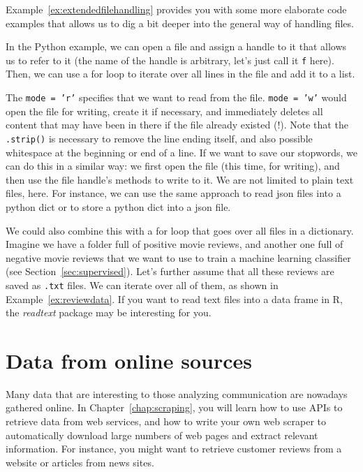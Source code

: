 Example~\ref{ex:extendedfilehandling} provides you with some more elaborate code examples that allows us to dig a bit deeper into the general way of handling files.

In the Python example,  we can open a file and assign a handle to it that allows us to refer to it (the name of the handle is arbitrary, let's just call it \texttt{f} here).
Then, we can use a for loop to iterate over all lines in the file and add it to a list.

The \texttt{mode = 'r'} specifies that we want to read from the file. \texttt{mode = 'w'} would open the file for writing, create it if necessary, and immediately deletes all content that may have been in there if the file already existed (!).
Note that the \texttt{.strip()} is necessary to remove the line ending itself, and also possible whitespace at the beginning or end of a line.
If we want to save our stopwords, we can do this in a similar way: we first open the file (this time, for writing), and then use the file handle's methods to write to it.
We are not limited to plain text files, here. For instance, we can use the same approach to read json files into a python dict or to store a python dict into a json file.

We could also combine this with a for loop that goes over all files in a dictionary.
Imagine we have a folder full of positive movie reviews, and another one full of negative movie reviews that we want to use to train a machine learning classifier (see Section~\ref{sec:supervised}).
Let's further assume that all these reviews are saved as \texttt{.txt} files.
We can iterate over all of them, as shown in Example~\ref{ex:reviewdata}. If you want to read text files into a data frame in R, the \emph{readtext} package may be interesting for you.


\section{Data from online sources}
\label{sec:gathering}

Many data that are interesting to those analyzing communication are
nowadays gathered online. In Chapter~\ref{chap:scraping}, you will
learn how to use APIs to retrieve data from web services, and how to
write your own web scraper to automatically download large numbers of
web pages and extract relevant information. For instance, you might
want to retrieve customer reviews from a website or articles from news
sites.


